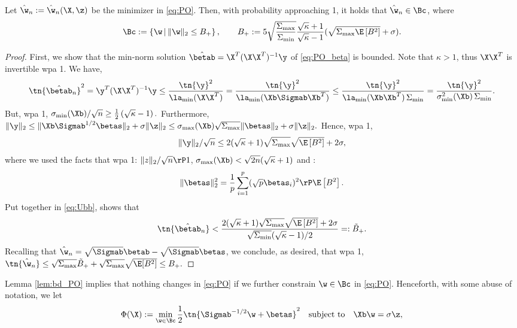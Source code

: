 \begin{lemma}\label{lem:bd_PO}
Let $\hat\w_n:=\hat\w_n(\X,\z)$ be the minimizer in \eqref{eq:PO}. Then, with probability approaching 1, it holds that $\hat\w_n\in\Bc$, where
$$\Bc:=\left\{\w\,|\,\|\w\|_2\leq B_{+} \right\},\qquad B_+:=5\sqrt{\frac{\Sigma_{\max}}{\Sigma_{\min}}}\frac{\sqrt{\kappa}+1}{\sqrt{\kappa}-1}(\sqrt{\Sigma_{\max}\E\left[B^2\right]} + \sigma).
$$ 
\end{lemma}
\begin{proof}
First, we show that the min-norm solution $\hat\betab=\X^T(\X\X^T)^{-1}\y$ of \eqref{eq:PO_beta} is bounded. Note that $\kappa>1$, thus $\X\X^T$ is invertible wpa 1. We
have,
\begin{align}
\tn{\hat\betab_n}^2 = \y^T(\X\X^T)^{-1}\y \leq \frac{\tn{\y}^2}{\la_{\min}(\X\X^T)}  = \frac{\tn{\y}^2}{\la_{\min}(\Xb\Sigmab\Xb^T)} \leq  \frac{\tn{\y}^2}{\la_{\min}(\Xb\Xb^T)\,\Sigma_{\min}} = \frac{\tn{\y}^2}{\sigma_{\min}^2(\Xb)\,\Sigma_{\min}}. \label{eq:Ubb}
\end{align}
But, wpa 1, 
$
\sigma_{\min}(\Xb)/\sqrt{n} \geq \frac{1}{2}\left(\sqrt{\kappa}-1\right).
$
Furthermore, 
$
\|\y\|_2 \leq \|\Xb\Sigmab^{1/2}\betas\|_2 + \sigma\|\z\|_2 \leq \sigma_{\max}(\Xb)\sqrt{\Sigma_{\max}} \|\betas\|_2 + \sigma\|\z\|_2.
$
Hence, wpa 1,
$$
\|\y\|_2/\sqrt{n} \leq 2(\sqrt{\kappa}+1)\sqrt{\Sigma_{\max}} \sqrt{\E\left[B^2\right]} + 2\sigma,
$$
where we used the facts that wpa 1: $\|z\|_2/\sqrt{n}\rP 1$, $\sigma_{\max}(\Xb)<\sqrt{2n}(\sqrt{\kappa}+1)$ and :
$$
\|\betas\|_2^2 = \frac{1}{p}\sum_{i=1}^{p}(\sqrt{p}\betas_i)^2 \rP \E\left[B^2\right].
$$
Put together in \eqref{eq:Ubb}, shows that
\begin{align}
\tn{\hat\betab_n} < \frac{2(\sqrt{\kappa}+1)\sqrt{\Sigma_{\max}} \sqrt{\E\left[B^2\right]} + 2\sigma}{\sqrt{\Sigma_{\min}}(\sqrt{\kappa}-1)/2} =: \tilde{B}_+.\label{eq:bd_beta}
\end{align}
Recalling that $\hat\w_n= \sqrt{\Sigmab}\betab - \sqrt{\Sigmab}\betas$, we conclude, as desired, that wpa 1,
$
\tn{\hat\w_n} \leq \sqrt{\Sigma_{\max}}\tilde{B}_+ + \sqrt{\Sigma_{\max}} \sqrt{\E[B^2]} \leq B_+.
$
\end{proof}

%


Lemma \ref{lem:bd_PO} implies that nothing changes in \eqref{eq:PO} if we further constrain $\w\in\Bc$ in \eqref{eq:PO}. Henceforth, with some abuse of notation, we let
\begin{align}\label{eq:PO_bd}
\Phi(\X):=\min_{\w\in\Bc} \frac{1}{2}\tn{\Sigmab^{-1/2}\w+\betas}^2\quad\text{subject to}\quad \Xb\w=\sigma \z,
\end{align}

